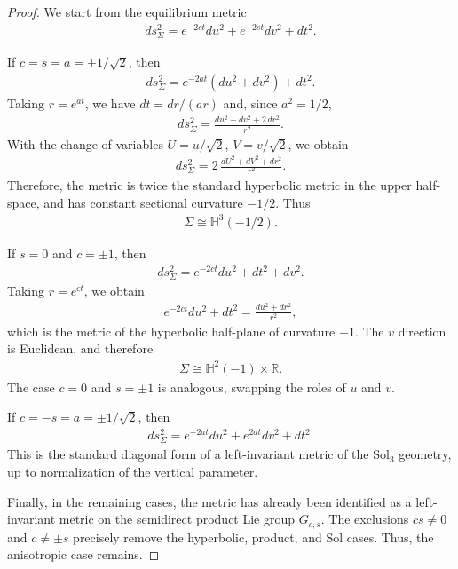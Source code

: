 \documentclass[11pt,a4paper]{amsart}
\theoremstyle{plain}
\theoremstyle{remark}
\newcommand{\R}{\mathbb{R}}
\newcommand{\Hyp}{\mathbb{H}}
\begin{document}
\begin{proof}
We start from the equilibrium metric
\begin{align*}
ds_\Sigma^2 = e^{-2ct}du^2+e^{-2st}dv^2+dt^2.
\end{align*}

If $c=s=a=\pm1/\sqrt2$, then
\begin{align*}
ds_\Sigma^2=e^{-2at}(du^2+dv^2)+dt^2.
\end{align*}
Taking $r=e^{at}$, we have $dt=dr/(ar)$ and, since $a^2=1/2$,
\begin{align*}
ds_\Sigma^2 = \frac{du^2+dv^2+2\,dr^2}{r^2}.
\end{align*}
With the change of variables $U=u/\sqrt2$, $V=v/\sqrt2$, we obtain
\begin{align*}
ds_\Sigma^2 = 2\,\frac{dU^2+dV^2+dr^2}{r^2}.
\end{align*}
Therefore, the metric is twice the standard hyperbolic metric in the upper 
half-space, and has constant sectional curvature $-1/2$. Thus
\begin{align*}
\Sigma\cong\Hyp^3(-1/2).
\end{align*}

If $s=0$ and $c=\pm1$, then
\begin{align*}
ds_\Sigma^2=e^{-2ct}du^2+dt^2+dv^2.
\end{align*}
Taking $r=e^{ct}$, we obtain
\begin{align*}
e^{-2ct}du^2+dt^2 = \frac{du^2+dr^2}{r^2},
\end{align*}
which is the metric of the hyperbolic half-plane of curvature $-1$. The 
$v$ direction is Euclidean, and therefore
\begin{align*}
\Sigma\cong\Hyp^2(-1)\times\R.
\end{align*}
The case $c=0$ and $s=\pm1$ is analogous, swapping the roles of $u$ and $v$.

If $c=-s=a=\pm1/\sqrt2$, then
\begin{align*}
ds_\Sigma^2 = e^{-2at}du^2+e^{2at}dv^2+dt^2.
\end{align*}
This is the standard diagonal form of a left-invariant metric of the 
$\mathrm{Sol}_3$ geometry, up to normalization of the vertical parameter.

Finally, in the remaining cases, the metric has already been identified as a 
left-invariant metric on the semidirect product Lie group $G_{c,s}$. The exclusions 
$cs\neq0$ and $c\neq\pm s$ precisely remove the hyperbolic, product, and 
Sol cases. Thus, the anisotropic case remains.
\end{proof}
\end{document}
